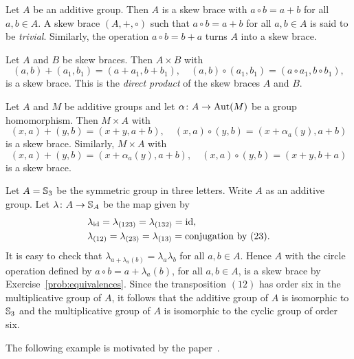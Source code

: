 \begin{example}
	\label{exa:trivial}
	Let $A$ be an additive group. Then $A$ is a skew brace with
	$a\circ b=a+b$ for all $a,b\in A$. 
	A skew brace $(A,+,\circ)$ such that $a\circ b=a+b$ for all $a,b\in A$ is
    said to be \emph{trivial}. 
	Similarly, the
   operation $a\circ b=b+a$ turns $A$ into a skew brace. 
\end{example}

\begin{example}
	\label{exa:times}
	Let $A$ and $B$ be skew braces. Then $A\times B$ with 
	\[
		(a,b)+(a_1,b_1)=(a+a_1,b+b_1),\quad
		(a,b)\circ (a_1,b_1)=(a\circ a_1,b\circ b_1),
	\]
	is a skew brace. This is the {\em direct product} of the skew braces $A$ and $B$. 
\end{example}

\begin{example}
	\label{exa:sd}
	Let $A$ and $M$ be additive groups and let $\alpha\colon A\to\operatorname{Aut}(M)$ be a
	group homomorphism. Then $M\times A$ with 
	\[
	(x,a)+(y,b)=(x+y,a+b),
	\quad
	(x,a)\circ (y,b)=(x+\alpha_a(y),a+b)
	\]
	is a skew brace. Similarly, $M\times A$ with
	\[
	(x,a)+(y,b)=(x+\alpha_a(y),a+b),\quad
	(x,a)\circ (y,b)=(x+y,b+a)
	\]
	is a skew brace. 
\end{example}

\begin{example}
  \label{exa:s3c6}
  Let $A=\mathbb{S}_3$ be the symmetric group in three letters. Write $A$ as an additive group. 
  Let $\lambda\colon A\to\mathbb{S}_A$ 
  be the map given by
  \begin{align*}
    &\lambda_{\operatorname{id}}=\lambda_{(123)}=\lambda_{(132)}=\operatorname{id},\\
    &\lambda_{(12)}=\lambda_{(23)}=\lambda_{(13)}=\text{conjugation by $(23)$}.
  \end{align*}
  It is easy to check that $\lambda_{a+\lambda_a(b)}=\lambda_a\lambda_b$
  for all $a,b\in A$. Hence $A$ with the circle operation defined by $a\circ b=a+\lambda_a(b)$, for all $a,b\in A$, is a skew brace by Exercise~\ref{prob:equivalences}. 
  Since the transposition $(12)$ has order
  six in the multiplicative group of $A$, it follows that the additive group of $A$ is isomorphic to $\mathbb{S}_3$ and
  the multiplicative group of $A$ is isomorphic to the cyclic group of order six. 
\end{example}

The following example is motivated by the paper~\cite{MR1178147}.

